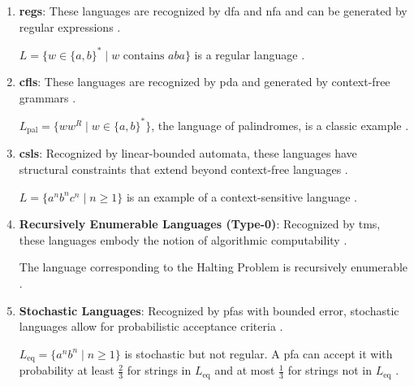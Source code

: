 \begin{enumerate}
    \item \textbf{\glspl{reg}}:  
    These languages are recognized by \gls{dfa} and \gls{nfa} and can be generated by regular expressions \cite{hopcroft2006introduction}. 
    \begin{example}
    $L = \{w \in \{a, b\}^\ast \mid w \text{ contains } aba\}$ is a regular language \cite{hopcroft2006introduction}.
    \end{example}
    
    \item \textbf{\glspl{cfl}}:  
    These languages are recognized by \gls{pda} and generated by context-free grammars \cite{chomsky1956three, hopcroft2006introduction}.  
    \begin{example}
    $L_{\text{pal}} = \{ww^R \mid w \in \{a, b\}^\ast\}$, the language of palindromes, is a classic example \cite{chomsky1956three}.
    \end{example}

    \item \textbf{\glspl{csl}}:  
    Recognized by linear-bounded automata, these languages have structural constraints that extend beyond context-free languages \cite{chomsky1956three, hopcroft2006introduction}.  
    \begin{example}
    $L = \{a^n b^n c^n \mid n \geq 1\}$ is an example of a context-sensitive language \cite{chomsky1956three}.
    \end{example}

    \item \textbf{Recursively Enumerable Languages (Type-0)}:  
    Recognized by \glspl{tm}, these languages embody the notion of algorithmic computability \cite{hopcroft2006introduction, turing1936computable}.  
    \begin{example}
    The language corresponding to the Halting Problem is recursively enumerable \cite{hopcroft2006introduction}.
    \end{example}

    \item \textbf{Stochastic Languages}:  
    Recognized by \glspl{pfa} with bounded error, stochastic languages allow for probabilistic acceptance criteria \cite{rabin1963probabilistic}.  
    \begin{example}
    $L_{\text{eq}} = \{a^n b^n \mid n \geq 1\}$ is stochastic but not regular. A \gls{pfa} can accept it with probability at least $\frac{2}{3}$ for strings in $L_{\text{eq}}$ and at most $\frac{1}{3}$ for strings not in $L_{\text{eq}}$ \cite{rabin1963probabilistic}.
    \end{example}
\end{enumerate}

